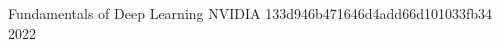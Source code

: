 

\begin{cvcerts}

  \cvcert
    {Fundamentals of Deep Learning} %
    {NVIDIA} %
    {133d946b471646d4add66d101033fb34} %
    {2022} %

\end{cvcerts}
